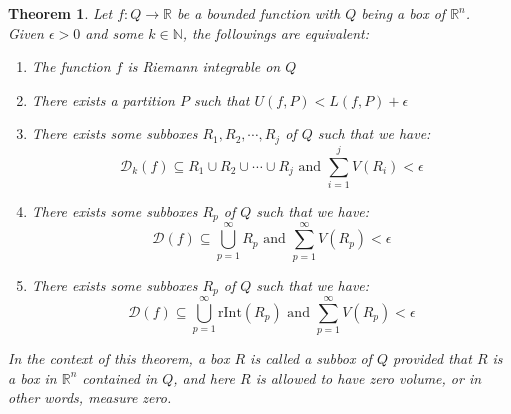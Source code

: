 \documentclass[15pt]{book}
\theoremstyle{break}
\theoremstyle{break}
\newtheorem{thm}{Theorem}[section]
\newcommand{\R}{\mathbb{R}}
\newcommand{\N}{\mathbb{N}}
\newcommand{\D}{\mathcal{D}}
\begin{document}
\begin{thm}
Let $f:Q \to \R$ be a bounded function with $Q$ being a box of $\R^n$.\\ Given $\epsilon>0$ and some $k \in \N$, the followings are equivalent:
\begin{enumerate}[topsep=3pt,itemsep=-1ex,partopsep=1ex,parsep=1ex]
\item The function $f$ is Riemann integrable on $Q$
\item There exists a partition $P$ such that $U(f,P) < L(f,P) + \epsilon$
\item There exists some subboxes $R_1,R_2,\cdots, R_j$ of $Q$ such that we have: 
$$\D_k(f) \subseteq R_1\cup R_2\cup\cdots\cup R_j \text{ and } \sum_{i=1}^j V(R_i) <\epsilon$$ 
\item There exists some subboxes $R_p$ of $Q$ such that we have: 
$$\D(f) \subseteq \bigcup_{p=1}^\infty R_p \text{ and } \sum_{p=1}^\infty V(R_p) < \epsilon$$
\item There exists some subboxes $R_p$ of $Q$ such that we have: 
$$\D(f) \subseteq \bigcup_{p=1}^\infty \text{rInt}(R_p) \text{ and } \sum_{p=1}^\infty V(R_p) < \epsilon$$
\end{enumerate}
In the context of this theorem, a box $R$ is called a subbox of $Q$ provided that $R$ is a box in $\R^n$ contained in $Q$, and here $R$ is allowed to have zero volume, or in other words, measure zero.
\end{thm}
\end{document}
